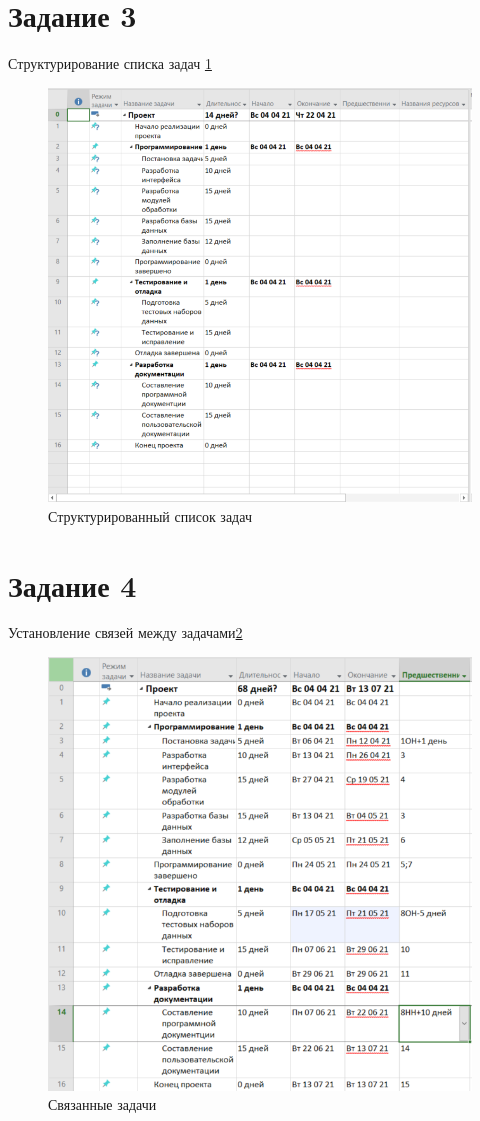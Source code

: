\section{Задание 3}
Структурирование списка задач \ref{fig:6}
\begin{figure}[H]
	\centering
	\includegraphics[width=0.7\linewidth]{src/6}
	\caption{Структурированный список задач}
	\label{fig:6}
\end{figure}

\section{Задание 4}
Установление связей между задачами\ref{fig:7}
\begin{figure}[H]
	\centering
	\includegraphics[width=0.7\linewidth]{src/7}
	\caption{Связанные задачи}
	\label{fig:7}
\end{figure}

